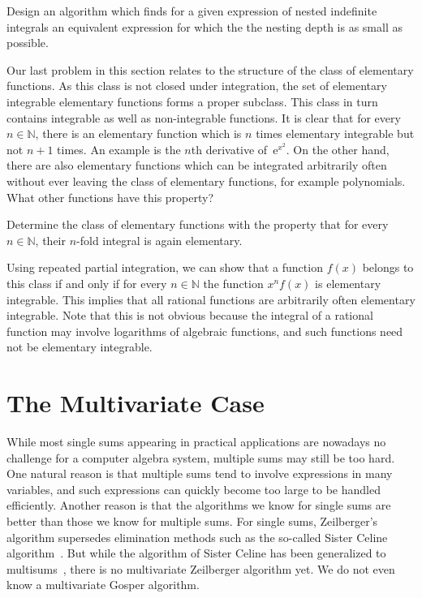 \documentclass{jssc}
\let\set\mathbb
\def\e{\mathrm{e}}
\begin{document}
 \begin{problem}
   Design an algorithm which finds for a given expression of nested indefinite integrals
   an equivalent expression for which the the nesting depth is as small as possible.
 \end{problem}


 Our last problem in this section relates to the structure of the class of elementary functions.
 As this class is not closed under integration, the set of elementary integrable elementary functions
 forms a proper subclass. This class in turn contains integrable as well as non-integrable functions.
 It is clear that for every $n\in\set N$, there is an elementary function which is $n$ times elementary
 integrable but not $n+1$ times. An example is the $n$th derivative of~$\e^{x^2}$. On the other hand, there
 are also elementary functions which can be integrated arbitrarily often without ever leaving the class of
 elementary functions, for example polynomials. What other functions have this property?

 \begin{problem}
   Determine the class of elementary functions with the property that for every
   $n\in\set N$, their $n$-fold integral is again elementary.
 \end{problem}

 Using repeated partial integration, we can show that a function $f(x)$ belongs to this class if and only
 if for every $n\in\set N$ the function $x^n f(x)$ is elementary integrable. This implies that all rational
 functions are arbitrarily often elementary integrable. Note that this is not obvious because the integral
 of a rational function may involve logarithms of algebraic functions, and such functions need not be
 elementary integrable.

 \section{The Multivariate Case}

 While most single sums appearing in practical applications are nowadays no
 challenge for a computer algebra system, multiple sums may still be too
 hard. One natural reason is that multiple sums tend to involve expressions in
 many variables, and such expressions can quickly become too large to be handled
 efficiently. Another reason is that the algorithms we know for single sums are
 better than those we know for multiple sums. For single sums, Zeilberger's
 algorithm supersedes elimination methods such as the so-called Sister Celine
 algorithm~\cite{fasenmyer49,verbaeten74,petkovsek97}. But while the algorithm
 of Sister Celine has been generalized to multisums~\cite{wilf92a,wegschaider97}, there
 is no multivariate Zeilberger algorithm yet. We do not even know a multivariate
 Gosper algorithm.
\end{document}

